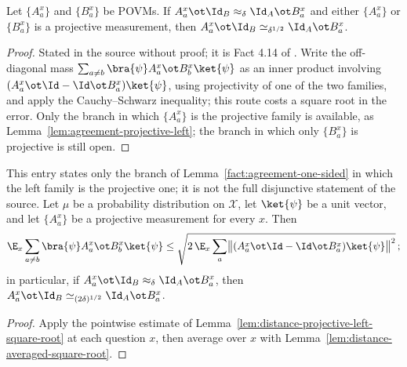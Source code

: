 \begin{lemma}\label{fact:agreement-one-sided}
	Let $\{A^x_a\}$ and $\{B^x_a\}$ be POVMs. If $A^x_a \ot \Id_B \approx_\delta \Id_A \ot B^x_a$ and either $\{A^x_a\}$ or $\{B^x_a\}$ is a projective measurement, then $A^x_a \ot \Id_B \simeq_{\delta^{1/2}} \Id_A \ot B^x_a$.
\end{lemma}
\begin{proof}
	Stated in the source without proof; it is Fact 4.14 of \cite{Natarajan2018NEEXP}. Write the off-diagonal mass $\sum_{a \ne b} \bra{\psi} A^x_a \ot B^x_b \ket{\psi}$ as an inner product involving $(A^x_a \ot \Id - \Id \ot B^x_a)\ket{\psi}$, using projectivity of one of the two families, and apply the Cauchy--Schwarz inequality; this route costs a square root in the error. Only the branch in which $\{A^x_a\}$ is the projective family is available, as Lemma~\ref{lem:agreement-projective-left}; the branch in which only $\{B^x_a\}$ is projective is still open.
\end{proof}

\begin{lemma}\label{lem:agreement-projective-left}
	\leanok
	This entry states only the branch of Lemma~\ref{fact:agreement-one-sided} in which the left family is the projective one; it is not the full disjunctive statement of the source. Let $\mu$ be a probability distribution on $\mathcal X$, let $\ket{\psi}$ be a unit vector, and let $\{A^x_a\}$ be a projective measurement for every $x$. Then
	\[
		\E_x \sum_{a \ne b} \bra{\psi} A^x_a \ot B^x_b \ket{\psi}
		\leq \sqrt{2\, \E_x \sum_a \bigl\lVert (A^x_a \ot \Id - \Id \ot B^x_a)\ket{\psi} \bigr\rVert^2}\,;
	\]
	in particular, if $A^x_a \ot \Id_B \approx_\delta \Id_A \ot B^x_a$, then $A^x_a \ot \Id_B \simeq_{(2\delta)^{1/2}} \Id_A \ot B^x_a$.
\end{lemma}
\begin{proof}
	\leanok
	Apply the pointwise estimate of Lemma~\ref{lem:distance-projective-left-square-root} at each question $x$, then average over $x$ with Lemma~\ref{lem:distance-averaged-square-root}.
\end{proof}

